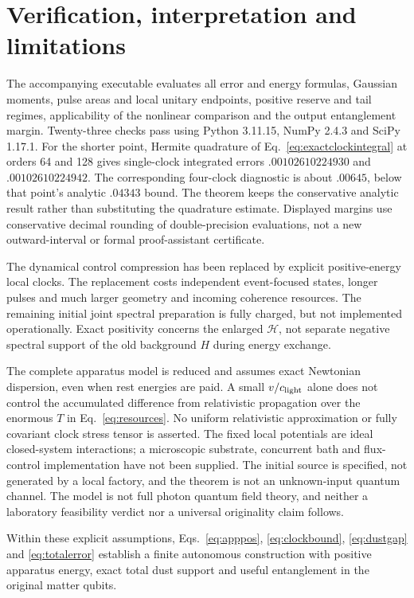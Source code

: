 \documentclass[11pt]{article}
\newcommand{\Hil}{\mathcal H}
\begin{document}
\section{Verification, interpretation and limitations}

The accompanying executable evaluates all error and energy formulas, Gaussian moments, pulse areas and local unitary endpoints, positive reserve and tail regimes, applicability of the nonlinear comparison and the output entanglement margin.
Twenty-three checks pass using Python 3.11.15, NumPy 2.4.3 and SciPy 1.17.1.
For the shorter point, Hermite quadrature of Eq.~\eqref{eq:exactclockintegral} at orders 64 and 128 gives single-clock integrated errors $.00102610224930$ and $.00102610224942$.
The corresponding four-clock diagnostic is about $.00645$, below that point's analytic $.04343$ bound.
The theorem keeps the conservative analytic result rather than substituting the quadrature estimate.
Displayed margins use conservative decimal rounding of double-precision evaluations, not a new outward-interval or formal proof-assistant certificate.

The dynamical control compression has been replaced by explicit positive-energy local clocks.
The replacement costs independent event-focused states, longer pulses and much larger geometry and incoming coherence resources.
The remaining initial joint spectral preparation is fully charged, but not implemented operationally.
Exact positivity concerns the enlarged $\Hil$, not separate negative spectral support of the old background $H$ during energy exchange.

The complete apparatus model is reduced and assumes exact Newtonian dispersion, even when rest energies are paid.
A small $v/c_{\rm light}$ alone does not control the accumulated difference from relativistic propagation over the enormous $T$ in Eq.~\eqref{eq:resources}.
No uniform relativistic approximation or fully covariant clock stress tensor is asserted.
The fixed local potentials are ideal closed-system interactions; a microscopic substrate, concurrent bath and flux-control implementation have not been supplied.
The initial source is specified, not generated by a local factory, and the theorem is not an unknown-input quantum channel.
The model is not full photon quantum field theory, and neither a laboratory feasibility verdict nor a universal originality claim follows.

Within these explicit assumptions, Eqs.~\eqref{eq:apppos}, \eqref{eq:clockbound}, \eqref{eq:dustgap} and \eqref{eq:totalerror} establish a finite autonomous construction with positive apparatus energy, exact total dust support and useful entanglement in the original matter qubits.
\end{document}
